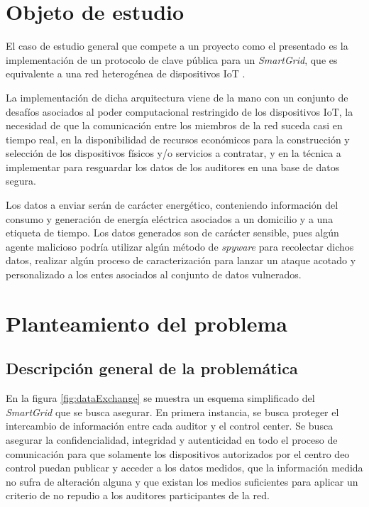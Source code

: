 \documentclass{article}
\begin{document}
    \section{Objeto de estudio} \label{sec:study_object}

        El caso de estudio general que compete a un proyecto como el presentado es la implementación de un protocolo de clave pública para un \textit{SmartGrid}, que es equivalente a una red heterogénea de dispositivos IoT \cite{smart_grid_def}.

        La implementación de dicha arquitectura viene de la mano con un conjunto de desafíos asociados al poder computacional restringido de los dispositivos IoT, la necesidad de que la comunicación entre los miembros de la red suceda casi en tiempo real, en la disponibilidad de recursos económicos para la construcción y selección de los dispositivos físicos y/o servicios a contratar, y en la técnica a implementar para resguardar los datos de los auditores en una base de datos segura.

        Los datos a enviar serán de carácter energético, conteniendo información del consumo y generación de energía eléctrica asociados a un domicilio y a una etiqueta de tiempo. Los datos generados son de carácter sensible, pues algún agente malicioso podría utilizar algún método de \textit{spyware} para recolectar dichos datos, realizar algún proceso de caracterización para lanzar un ataque acotado y personalizado a los entes asociados al conjunto de datos vulnerados.

    \section{Planteamiento del problema} \label{sec:problem_statement}

        \subsection{Descripción general de la problemática}

            En la figura \ref{fig:dataExchange} se muestra un esquema simplificado del \textit{SmartGrid} que se busca asegurar. En primera instancia, se busca proteger el intercambio de información entre cada auditor y el control center. Se busca asegurar la confidencialidad, integridad y autenticidad en todo el proceso de comunicación para que solamente los dispositivos autorizados por el centro deo control puedan publicar y acceder a los datos medidos, que la información medida no sufra de alteración alguna y que existan los medios suficientes para aplicar un criterio de no repudio a los auditores participantes de la red.
\end{document}
